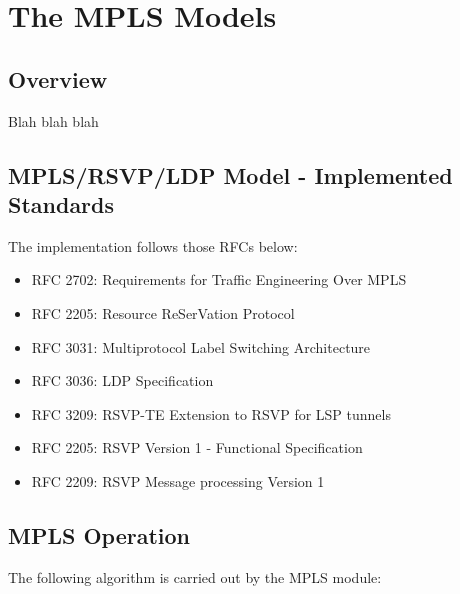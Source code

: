 \chapter{The MPLS Models}
\label{cha:mpls}


\section{Overview}

Blah blah blah


\section{MPLS/RSVP/LDP Model - Implemented Standards}

The implementation follows those RFCs below:

\begin{itemize}
  \item RFC 2702: Requirements for Traffic Engineering Over MPLS
  \item RFC 2205: Resource ReSerVation Protocol
  \item RFC 3031: Multiprotocol Label Switching Architecture
  \item RFC 3036: LDP Specification
  \item RFC 3209: RSVP-TE Extension to RSVP for LSP tunnels
  \item RFC 2205: RSVP Version 1 - Functional Specification
  \item RFC 2209: RSVP Message processing Version 1
\end{itemize}

\section{MPLS Operation}

The following algorithm is carried out by the MPLS module:

